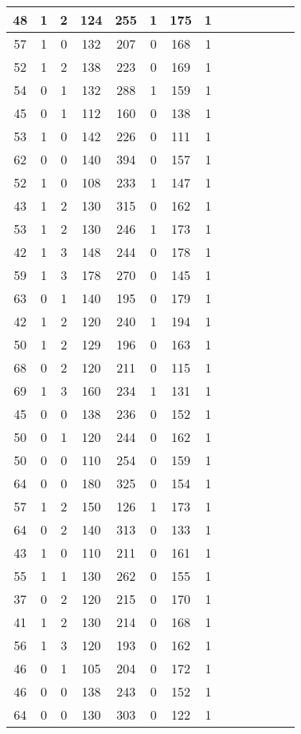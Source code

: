 \documentclass{article}
\begin{document}
\begin{longtable}{|c|c|c|c|c|c|c|c|c|c|c|c|c|c|}
\hline
48 & 1 & 2 & 124 & 255 & 1 & 175 & 1\\
\hline
57 & 1 & 0 & 132 & 207 & 0 & 168 & 1\\
\hline
52 & 1 & 2 & 138 & 223 & 0 & 169 & 1\\
\hline
54 & 0 & 1 & 132 & 288 & 1 & 159 & 1\\
\hline
45 & 0 & 1 & 112 & 160 & 0 & 138 & 1\\
\hline
53 & 1 & 0 & 142 & 226 & 0 & 111 & 1\\
\hline
62 & 0 & 0 & 140 & 394 & 0 & 157 & 1\\
\hline
52 & 1 & 0 & 108 & 233 & 1 & 147 & 1\\
\hline
43 & 1 & 2 & 130 & 315 & 0 & 162 & 1\\
\hline
53 & 1 & 2 & 130 & 246 & 1 & 173 & 1\\
\hline
42 & 1 & 3 & 148 & 244 & 0 & 178 & 1\\
\hline
59 & 1 & 3 & 178 & 270 & 0 & 145 & 1\\
\hline
63 & 0 & 1 & 140 & 195 & 0 & 179 & 1\\
\hline
42 & 1 & 2 & 120 & 240 & 1 & 194 & 1\\
\hline
50 & 1 & 2 & 129 & 196 & 0 & 163 & 1\\
\hline
68 & 0 & 2 & 120 & 211 & 0 & 115 & 1\\
\hline
69 & 1 & 3 & 160 & 234 & 1 & 131 & 1\\
\hline
45 & 0 & 0 & 138 & 236 & 0 & 152 & 1\\
\hline
50 & 0 & 1 & 120 & 244 & 0 & 162 & 1\\
\hline
50 & 0 & 0 & 110 & 254 & 0 & 159 & 1\\
\hline
64 & 0 & 0 & 180 & 325 & 0 & 154 & 1\\
\hline
57 & 1 & 2 & 150 & 126 & 1 & 173 & 1\\
\hline
64 & 0 & 2 & 140 & 313 & 0 & 133 & 1\\
\hline
43 & 1 & 0 & 110 & 211 & 0 & 161 & 1\\
\hline
55 & 1 & 1 & 130 & 262 & 0 & 155 & 1\\
\hline
37 & 0 & 2 & 120 & 215 & 0 & 170 & 1\\
\hline
41 & 1 & 2 & 130 & 214 & 0 & 168 & 1\\
\hline
56 & 1 & 3 & 120 & 193 & 0 & 162 & 1\\
\hline
46 & 0 & 1 & 105 & 204 & 0 & 172 & 1\\
\hline
46 & 0 & 0 & 138 & 243 & 0 & 152 & 1\\
\hline
64 & 0 & 0 & 130 & 303 & 0 & 122 & 1\\

\end{longtable}
\end{document}
